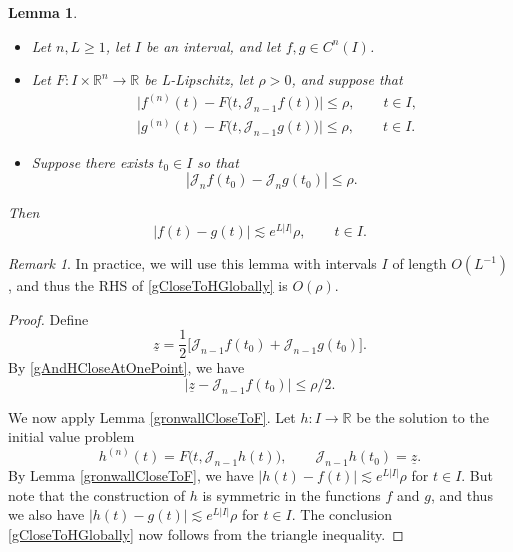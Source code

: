 \documentclass[letterpaper, reqno,11pt]{article}
\numberwithin{equation}{section}
\newcommand{\RR}{\mathbb{R}}
\numberwithin{thm}{section}
\newtheorem{lem}[thm]{Lemma}
\theoremstyle{remark}
\newtheorem{rem}[thm]{Remark}
\begin{document}

\begin{lem}\label{polyCurvesCloseForever}
$\phantom{1}$
\begin{itemize}
    \item Let $n,L\geq 1$, let $I$ be an interval, and let $f,g \in C^n(I)$.

    \item Let $F\colon I\times\RR^n \to\RR$ be L-Lipschitz, let $\rho>0$, and suppose that
    \begin{equation}\label{jetGHinS}
    \begin{split}
    & \big|f^{(n)}(t) - F\big(t, \mathcal{J}_{n-1}f(t)\big)\big| \leq \rho,\qquad t\in I,\\
    & \big|g^{(n)}(t) - F\big(t, \mathcal{J}_{n-1}g(t)\big)\big| \leq \rho,\qquad t\in I.
    \end{split}
    \end{equation} 

    \item Suppose there exists $t_0\in I$ so that
    \begin{equation}\label{gAndHCloseAtOnePoint}
        |\mathcal{J}_n f(t_0) - \mathcal{J}_n g(t_0)|\leq\rho.
    \end{equation}
\end{itemize}

Then
\begin{equation}\label{gCloseToHGlobally}
|f(t)-g(t)|\lesssim e^{L|I|}\rho,\qquad t\in I.
\end{equation}
\end{lem}
\begin{rem}
In practice, we will use this lemma with intervals $I$ of length $O(L^{-1})$, and thus the RHS of \eqref{gCloseToHGlobally} is $O(\rho)$. 
\end{rem}
\begin{proof} 
Define
\[
\underline z = \frac{1}{2}\Big[ \mathcal{J}_{n-1}f(t_0) + \mathcal{J}_{n-1}g(t_0) \Big].
\]
By \eqref{gAndHCloseAtOnePoint}, we have 
\[
\big|\underline z - \mathcal{J}_{n-1}f(t_0)\big|\leq \rho/2.
\]


We now apply Lemma \ref{gronwallCloseToF}. Let $h\colon I \to\RR$ be the solution to the initial value problem
\[
h^{(n)}(t) =  F\big(t, \mathcal{J}_{n-1} h(t)\big),\qquad \mathcal{J}_{n-1} h( t_0)=\underline z.
\]
By Lemma \ref{gronwallCloseToF}, we have $|h(t) - f(t)|\lesssim e^{L|I|}\rho$ for $t\in I$. But note that the construction of $h$ is symmetric in the functions $f$ and $g$, and thus we also have $|h(t) - g(t)|\lesssim e^{L|I|}\rho$ for $t\in I$. The conclusion \eqref{gCloseToHGlobally} now follows from the triangle inequality. 
\end{proof}
\end{document}

